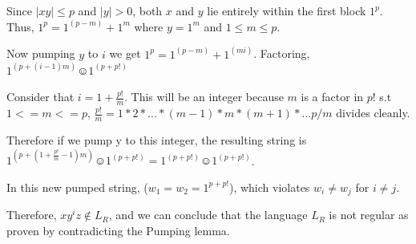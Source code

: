 \documentclass[a4paper]{exam}
\begin{document}
\begin{questions}
\begin{solution}
		Since $|xy| \leq p$ and $|y| > 0$, both $x$ and $y$ lie entirely within the first block $1^p$. Thus, $1^p = 1^{(p-m)} + 1^m$ where $y= 1^m$ and $1 \leq m \leq p$.

		Now pumping $y$ to $i$ we get $1^p = 1^{(p-m)} + 1^{(mi)}$. Factoring, $1^{(p+(i-1)m)} \smiley 1^{(p+p!)}$

		Consider that $i = 1 + \frac{p!}{m}$. This will be an integer because $m$ is a factor in $p!$ s.t $1 <= m <= p$, $\frac{p!}{m} = 1*2*...*(m-1)*m*(m+1)*...p / m$ divides cleanly.

		Therefore if we pump y to this integer, the resulting string is $1^{(p + (1 + \frac{p!}{m} - 1)m)} \smiley 1^{(p + p!)} = 1^{(p + p!)} \smiley 1^{(p + p!)}$.

		In this new pumped string, ($w_1 = w_2 = 1^{p + p!}$), which violates $w_i \neq w_j$ for $i \neq j$.

		Therefore, $xy^iz \notin L_R$, and we can conclude that the language $L_R$ is not regular as proven by contradicting the Pumping lemma.
	\end{solution}


\end{questions}
\end{document}
